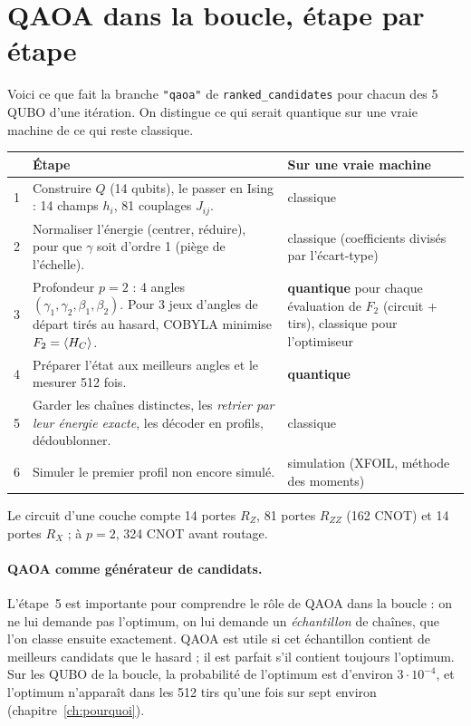 \section{QAOA dans la boucle, étape par étape}\label{sec:qaoa-boucle}
Voici ce que fait la branche \texttt{"qaoa"} de \texttt{ranked\_candidates} pour chacun des 5 QUBO d'une itération. On distingue ce qui serait quantique sur une vraie machine de ce qui reste classique.
\begin{center}
\renewcommand{\arraystretch}{1.25}
\begin{tabularx}{\linewidth}{c>{\raggedright\arraybackslash}X>{\raggedright\arraybackslash}p{3.6cm}}
\toprule
& Étape & Sur une vraie machine \\
\midrule
1 & Construire $Q$ (14 qubits), le passer en Ising : 14 champs $h_i$, 81 couplages $J_{ij}$. & classique \\
2 & Normaliser l'énergie (centrer, réduire), pour que $\gamma$ soit d'ordre 1 (piège de l'échelle). & classique (coefficients divisés par l'écart-type) \\
3 & Profondeur $p=2$ : 4 angles $(\gamma_1,\gamma_2,\beta_1,\beta_2)$. Pour 3 jeux d'angles de départ tirés au hasard, COBYLA minimise $F_2=\langle H_C\rangle$. & \textbf{quantique} pour chaque évaluation de $F_2$ (circuit + tirs), classique pour l'optimiseur \\
4 & Préparer l'état aux meilleurs angles et le mesurer 512 fois. & \textbf{quantique} \\
5 & Garder les chaînes distinctes, les \emph{retrier par leur énergie exacte}, les décoder en profils, dédoublonner. & classique \\
6 & Simuler le premier profil non encore simulé. & simulation (XFOIL, méthode des moments) \\
\bottomrule
\end{tabularx}
\end{center}
Le circuit d'une couche compte 14 portes $R_Z$, 81 portes $R_{ZZ}$ (162 CNOT) et 14 portes $R_X$ ; à $p=2$, 324 CNOT avant routage.

\paragraph{QAOA comme générateur de candidats.} L'étape~5 est importante pour comprendre le rôle de QAOA dans la boucle : on ne lui demande pas l'optimum, on lui demande un \emph{échantillon} de chaînes, que l'on classe ensuite exactement. QAOA est utile si cet échantillon contient de meilleurs candidats que le hasard ; il est parfait s'il contient toujours l'optimum. Sur les QUBO de la boucle, la probabilité de l'optimum est d'environ $3\cdot10^{-4}$, et l'optimum n'apparaît dans les 512 tirs qu'une fois sur sept environ (chapitre~\ref{ch:pourquoi}).

